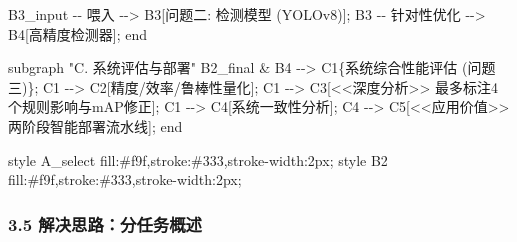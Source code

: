 \documentclass[
]{article}
\newenvironment{Shaded}{}{}
\newcommand{\NormalTok}[1]{#1}
\begin{document}
\begin{Shaded}
\begin{Highlighting}[]
\NormalTok{        B3\_input {-}{-} 喂入 {-}{-}\textgreater{} B3[问题二: 检测模型 (YOLOv8)];}
\NormalTok{        B3 {-}{-} 针对性优化 {-}{-}\textgreater{} B4[高精度检测器];}
\NormalTok{    end}

\NormalTok{    subgraph "C. 系统评估与部署"}
\NormalTok{        B2\_final \& B4 {-}{-}\textgreater{} C1\{系统综合性能评估 (问题三)\};}
\NormalTok{        C1 {-}{-}\textgreater{} C2[精度/效率/鲁棒性量化];}
\NormalTok{        C1 {-}{-}\textgreater{} C3[\textless{}\textless{}深度分析\textgreater{}\textgreater{} \textquotesingle{}最多标注4个\textquotesingle{}规则影响与mAP修正];}
\NormalTok{        C1 {-}{-}\textgreater{} C4[系统一致性分析];}
\NormalTok{        C4 {-}{-}\textgreater{} C5[\textless{}\textless{}应用价值\textgreater{}\textgreater{} 两阶段智能部署流水线];}
\NormalTok{    end}

\NormalTok{    style A\_select fill:\#f9f,stroke:\#333,stroke{-}width:2px;}
\NormalTok{    style B2 fill:\#f9f,stroke:\#333,stroke{-}width:2px;}
\end{Highlighting}
\end{Shaded}

\subsubsection{\texorpdfstring{\textbf{3.5
解决思路：分任务概述}}{3.5 解决思路：分任务概述}}\label{35-ux89e3ux51b3ux601dux8defux5206ux4efbux52a1ux6982ux8ff0}
\end{document}
